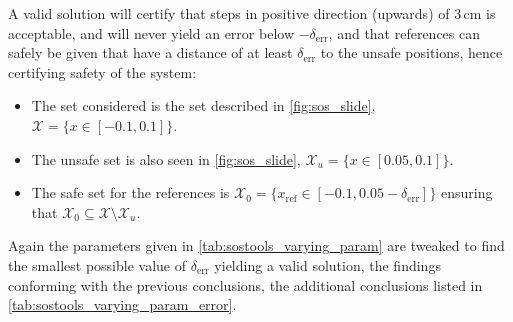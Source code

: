 A valid solution will certify that steps in positive direction (upwards) of 3\,cm is acceptable, and will never yield an error below $-\delta_\text{err}$, and that references can safely be given that have a distance of at least $\delta_\text{err}$ to the unsafe positions, hence certifying safety of the system: %
\vspace{-3mm}
\begin{itemize}
	\itemsep-0.7mm
	\item The set considered is the set described in \autoref{fig:sos_slide}, $\mathcal{X}=\{x\in[-0.1,0.1] \}$.
	\item The unsafe set is also seen in \autoref{fig:sos_slide}, $\mathcal{X}_u=\{x\in [0.05,0.1] \}$.
	\item The safe set for the references is $\mathcal{X}_0=\{x_\text{ref}\in [-0.1,0.05-\delta_\text{err}] \}$ ensuring that $\mathcal{X}_0\subseteq\mathcal{X}\setminus\mathcal{X}_u$.
\end{itemize}

Again the parameters given in \autoref{tab:sostools_varying_param} are tweaked to find the smallest possible value of $\delta_\text{err}$ yielding a valid solution, the findings conforming with the previous conclusions, the additional conclusions listed in \autoref{tab:sostools_varying_param_error}.

